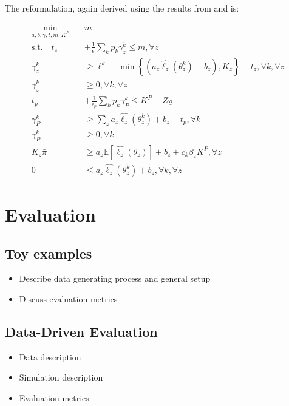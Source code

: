 \documentclass[11pt]{article}
\begin{document}
        The reformulation, again derived using the results from \cite{rockafellar2000optimization} and \cite{rockafellar2002conditional} is: 
        
        \begin{align}
            \min_{a,b,\gamma,t,m,K^P} \quad & m\\
            \text{s.t.} \quad t_z &+ \frac{1}{\epsilon} \sum_k p_k \gamma_z^k \leq m, \forall z\\
            \gamma_z^k &\geq \ell^k - \min\left\{(a_z\hat{\ell_z}(\theta_z^k) + b_z), K_z\right\} -t_z, \forall k, \forall z \\
            \gamma_z^k &\geq 0, \forall k, \forall z\\
            t_p &+ \frac{1}{\epsilon_p} \sum_k p_k \gamma_P^k \leq K^P+Z\underline{\pi}\\
            \gamma_P^k &\geq \sum_z a_z \hat{\ell_z}(\theta^k_z) + b_z -t_p, \forall k \\
            \gamma_P^k &\geq 0, \forall k\\
            K_z\bar{\pi} &\geq a_z \mathbb{E}[\hat{\ell_z}(\theta_z)] + b_z + c_k \beta_z K^P, \forall z \\
            0 &\leq a_z \hat{\ell_z}(\theta_z^k) + b_z, \forall k, \forall z
        \end{align}

\section{Evaluation}
  \subsection{Toy examples}
    \begin{itemize}
        \item Describe data generating process and general setup
        \item Discuss evaluation metrics
    \end{itemize}

  \subsection{Data-Driven Evaluation}
    \begin{itemize}
        \item Data description
        \item Simulation description
        \item Evaluation metrics
    \end{itemize}
\end{document}
